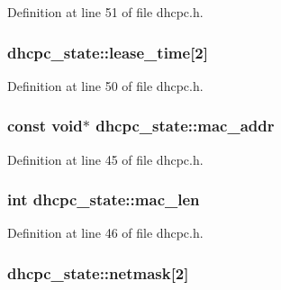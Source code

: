 Definition at line 51 of file dhcpc.h.

\hypertarget{structdhcpc__state_a7a520a57d7d0541524f34a7685635597}{
\subsubsection[{lease\_\-time}]{ {\bf dhcpc\_\-state::lease\_\-time}\mbox{[}2\mbox{]}}}
\label{structdhcpc__state_a7a520a57d7d0541524f34a7685635597}


Definition at line 50 of file dhcpc.h.

\hypertarget{structdhcpc__state_a2391bb18db5f620e0e9fb848ae5ba5e9}{
\subsubsection[{mac\_\-addr}]{\setlength{\rightskip}{0pt plus 5cm}const void$\ast$ {\bf dhcpc\_\-state::mac\_\-addr}}}
\label{structdhcpc__state_a2391bb18db5f620e0e9fb848ae5ba5e9}


Definition at line 45 of file dhcpc.h.

\hypertarget{structdhcpc__state_a5361ef75bfbdb469b5cc31f0060a2670}{
\subsubsection[{mac\_\-len}]{\setlength{\rightskip}{0pt plus 5cm}int {\bf dhcpc\_\-state::mac\_\-len}}}
\label{structdhcpc__state_a5361ef75bfbdb469b5cc31f0060a2670}


Definition at line 46 of file dhcpc.h.

\hypertarget{structdhcpc__state_a20541305548441e5dcb2e1e7e6f300eb}{
\subsubsection[{netmask}]{ {\bf dhcpc\_\-state::netmask}\mbox{[}2\mbox{]}}}
\label{structdhcpc__state_a20541305548441e5dcb2e1e7e6f300eb}


